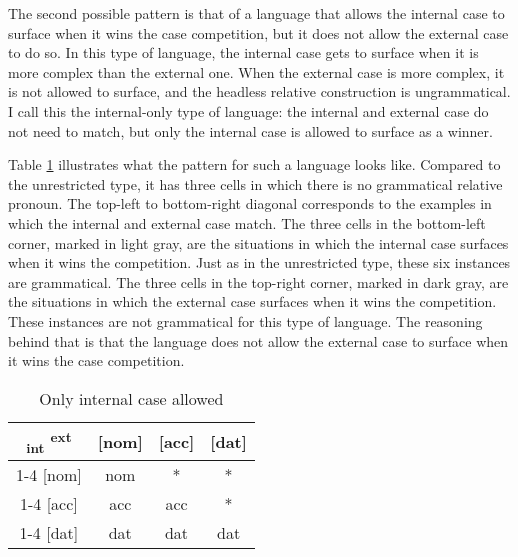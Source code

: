 The second possible pattern is that of a language that allows the internal case to surface when it wins the case competition, but it does not allow the external case to do so. In this type of language, the internal case gets to surface when it is more complex than the external one. When the external case is more complex, it is not allowed to surface, and the headless relative construction is ungrammatical. I call this the internal-only type of language: the internal and external case do not need to match, but only the internal case is allowed to surface as a winner.

Table \ref{tbl:case-competition-only-int} illustrates what the pattern for such a language looks like. Compared to the unrestricted type, it has three cells in which there is no grammatical relative pronoun.
The top-left to bottom-right diagonal corresponds to the examples in which the internal and external case match.
The three cells in the bottom-left corner, marked in light gray, are the situations in which the internal case surfaces when it wins the competition.
Just as in the unrestricted type, these six instances are grammatical.
The three cells in the top-right corner, marked in dark gray, are the situations in which the external case surfaces when it wins the competition. These instances are not grammatical for this type of language. The reasoning behind that is that the language does not allow the external case to surface when it wins the case competition.


\begin{table}[ht]
  \center
  \caption{Only internal case allowed}
  \begin{tabular}{c|c|c|c}
    \toprule
    \textsubscript{\ac{int}} \textsuperscript{\ac{ext}}
           & [\ac{nom}]
           & [\ac{acc}]
           & [\ac{dat}]
           \\ \cmidrule{1-4}
       [\ac{nom}]
           & \ac{nom}
           & \cellcolor{DG}*
           & \cellcolor{DG}*
           \\ \cmidrule{1-4}
       [\ac{acc}]
           & \cellcolor{LG}\ac{acc}
           & \ac{acc}
           & \cellcolor{DG}*
           \\ \cmidrule{1-4}
       [\ac{dat}]
           & \cellcolor{LG}\ac{dat}
           & \cellcolor{LG}\ac{dat}
           & \ac{dat}
           \\
     \bottomrule
  \end{tabular}
    \label{tbl:case-competition-only-int}
\end{table}

